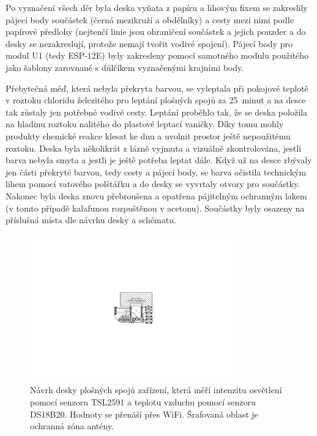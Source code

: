         Po vyznačení všech děr byla deska vyňata z papíru a lihovým fixem se zakreslily pájecí body součástek (černá mezikruží a obdélníky) a cesty mezi nimi podle papírové předlohy (nejtenčí linie jsou ohraničení součástek a jejich pouzder a do desky se nezakreslují, protože nemají tvořit vodivé spojení). Pájecí body pro modul U1 (tedy ESP-12E) byly zakresleny pomocí samotného modulu použitého jako šablony zarovnané s důlčíkem vyznačenými krajními body.
        
        Přebytečná měď, která nebyla překryta barvou, se vyleptala při pokojové teplotě v roztoku chloridu železitého pro leptání plošných spojů za 25~minut a na desce tak zůstaly jen potřebné vodivé cesty. Leptání proběhlo tak, že se deska položila na hladinu roztoku nalitého do plastové leptací vaničky. Díky tomu mohly produkty chemické reakce klesat ke dnu a uvolnit prostor ještě nepoužitému roztoku. Deska byla několikrát z lázně vyjmuta a vizuálně zkontrolována, jestli barva nebyla smyta a jestli je ještě potřeba leptat dále. Když už na desce zbývaly jen části překryté barvou, tedy cesty a pájecí body, se barva očistila technickým lihem pomocí vatového polštářku a do desky se vyvrtaly otvory pro součástky. Nakonec byla deska znovu přebroušena a opatřena pájitelným ochranným lakem (v tomto případě kalafunou rozpuštěnou v acetonu). Součástky byly osazeny na příslušná místa dle návrhu desky a schématu.
        \begin{figure}
            \centering
            \includegraphics[draft=false,width=0.8\textwidth,trim={11.8cm 8.2cm 11.8cm 9.7cm},clip]{img/hw/esp_lux_temp_dps.pdf}
            \caption[Návrh \acrshort{dps} měřicích zařízení]{Návrh desky plošných spojů zařízení, která měří intenzitu osvětlení pomocí senzoru TSL2591 a teplotu vzduchu pomocí senzoru DS18B20. Hodnoty se přenáší přes WiFi. Šrafovaná oblast je ochranná zóna antény.}
            \label{fig:dps}
        \end{figure}
